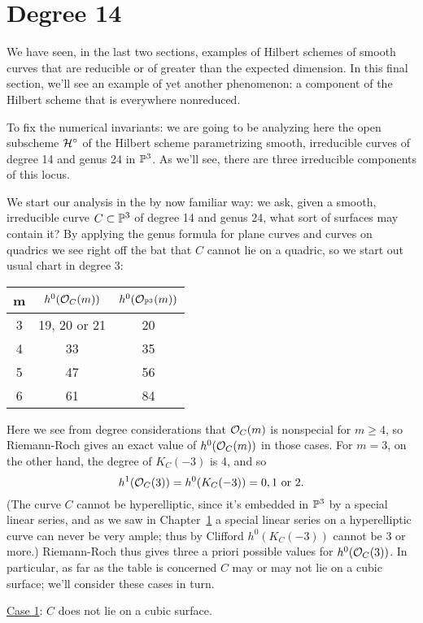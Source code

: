 \section{Degree 14}

We have seen, in the last two sections, examples of Hilbert schemes of smooth curves that are reducible or of greater than the expected dimension. In this final section, we'll see an example of yet another phenomenon: a component of the Hilbert scheme that is everywhere nonreduced. 

To fix the numerical invariants: we are going to be analyzing here the open subscheme ${\cal H}^\circ$ of the Hilbert scheme parametrizing smooth, irreducible curves of degree 14 and genus 24 in ${\mathbb P}^3$. As we'll see, there are three irreducible components of this locus. 

We start our analysis in the by now familiar way: we ask, given a smooth, irreducible curve $C \subset {\mathbb P}^3$ of degree 14 and genus 24, what sort of surfaces may contain it? By applying the genus formula for plane curves and curves on quadrics we see right off the bat that $C$ cannot lie on a quadric, so we start out usual chart in degree 3:

\begin{center}
\begin{tabular}{ c | c | c }
 m & $h^0({\mathcal O}_C(m))$ & $h^0({\mathcal O}_{{\mathbb P}^3}(m))$ \\
 \hline
 3 & 19, 20 or 21 & 20 \\
 4 & 33 & 35 \\
 5 & 47 & 56 \\
 6 & 61 & 84
\end{tabular}
\end{center}

Here we see from degree considerations that ${\mathcal O}_C(m)$ is nonspecial for $m \geq 4$, so Riemann-Roch gives an exact value of $h^0({\mathcal O}_C(m))$ in those cases. For $m=3$, on the other hand, the degree of $K_C(-3)$ is 4, and so 
$$
h^1({\mathcal O}_C(3)) = h^0(K_C(-3)) = 0, 1 \text{ or } 2.
$$
(The curve $C$ cannot be hyperelliptic, since it's embedded in ${\mathbb P}^3$ by a special linear series, and as we saw in Chapter~\ref{} a special linear series on a hyperelliptic curve can never be very ample; thus by Clifford $h^0(K_C(-3))$ cannot be 3 or more.) Riemann-Roch thus gives three a priori possible values for $h^0({\mathcal O}_C(3))$. In particular, as far as the table is concerned $C$ may or may not lie on a cubic surface; we'll consider these cases in turn.

\noindent \underline{Case 1}: $C$ does not lie on a cubic surface. 

